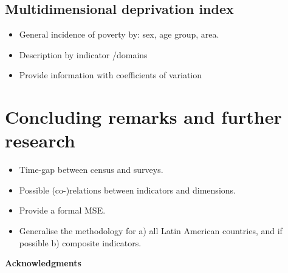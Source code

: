 \documentclass[a4paper, 11pt]{article}
\begin{document}
\subsection{Multidimensional deprivation index}


\begin{itemize}
    \item General incidence of poverty by: sex, age group, area.
    \item Description by indicator /domains
    \item Provide information with coefficients of variation 
\end{itemize}






\section{Concluding remarks and further research}


\begin{itemize}
    \item Time-gap between census and surveys.
    \item Possible (co-)relations between indicators and dimensions. 
    \item Provide a formal MSE. 
    \item Generalise the methodology for a) all Latin American countries, and if possible b) composite indicators. 
\end{itemize}

\textbf{Acknowledgments}


\newpage


\end{document}
